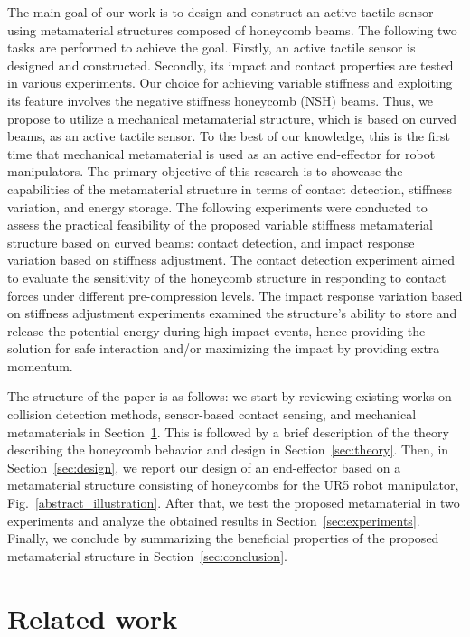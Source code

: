 \documentclass[lettersize,journal]{IEEEtran}
\begin{document}
The main goal of our work is to design and construct an active tactile sensor using metamaterial structures composed of honeycomb beams. The following two tasks are performed to achieve the goal. Firstly, an active tactile sensor is designed and constructed. Secondly, its impact and contact properties are tested in various experiments. Our choice for achieving variable stiffness and exploiting its feature involves the negative stiffness honeycomb (NSH) beams. Thus, we propose to utilize a mechanical metamaterial structure, which is based on curved beams, as an active tactile sensor. To the best of our knowledge, this is the first time that mechanical metamaterial is used as an active end-effector for robot manipulators. The primary objective of this research is to showcase the capabilities of the metamaterial structure in terms of contact detection, stiffness variation, and energy storage. The following experiments were conducted to assess the practical feasibility of the proposed variable stiffness metamaterial structure based on curved beams: contact detection, and impact response variation based on stiffness adjustment. The contact detection experiment aimed to evaluate the sensitivity of the honeycomb structure in responding to contact forces under different pre-compression levels. The impact response variation based on stiffness adjustment experiments examined the structure's ability to store and release the potential energy during high-impact events, hence providing the solution for safe interaction and/or maximizing the impact by providing extra momentum. 


The structure of the paper is as follows: we start by reviewing existing works on collision detection methods, sensor-based contact sensing, and mechanical metamaterials in Section~\ref{sec:background}. This is followed by a brief description of the theory describing the honeycomb behavior and design in Section~\ref{sec:theory}. Then, in Section~\ref{sec:design}, we report our design of an end-effector based on a metamaterial structure consisting of honeycombs for the UR5 robot manipulator, Fig.~\ref{abstract_illustration}. After that, we test the proposed metamaterial in two experiments and analyze the obtained results in Section~\ref{sec:experiments}. Finally, we conclude by summarizing the beneficial properties of the proposed metamaterial structure in Section~\ref{sec:conclusion}.


\section{Related work}
\label{sec:background}
\end{document}
